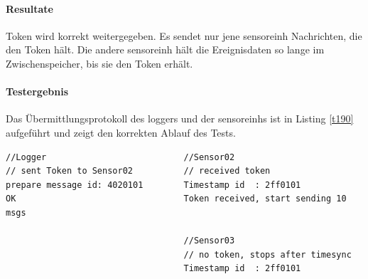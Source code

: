 \paragraph{Resultate} Token wird korrekt weitergegeben. Es sendet nur jene \gls{sensoreinh} Nachrichten, die den Token hält. Die andere \gls{sensoreinh} hält die Ereignisdaten so lange im Zwischenspeicher, bis sie den Token erhält.

\paragraph{Testergebnis} Das Übermittlungsprotokoll des \gls{logger}s und der \glspl{sensoreinh} ist in Listing \ref{t190} aufgeführt und zeigt den korrekten Ablauf des Tests.

\begin{lstlisting}[caption=T190 Tokenvergabe, label=t190]
//Logger                           //Sensor02
// sent Token to Sensor02          // received token
prepare message id: 4020101        Timestamp id  : 2ff0101
OK                                 Token received, start sending 10 msgs

                                   //Sensor03
                                   // no token, stops after timesync
                                   Timestamp id  : 2ff0101


\end{lstlisting}
